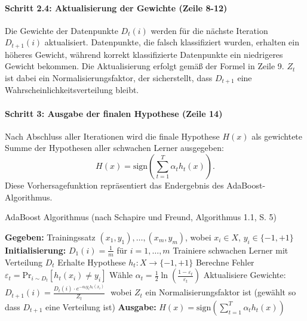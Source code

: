 \paragraph{Schritt 2.4: Aktualisierung der Gewichte (Zeile 8-12)}
Die Gewichte der Datenpunkte \( D_t(i) \) werden für die nächste Iteration \( D_{t+1}(i) \) aktualisiert. Datenpunkte, die falsch klassifiziert wurden, erhalten ein höheres Gewicht, während korrekt klassifizierte Datenpunkte ein niedrigeres Gewicht bekommen. Die Aktualisierung erfolgt gemäß der Formel in Zeile 9. \( Z_t \) ist dabei ein Normalisierungsfaktor, der sicherstellt, dass \( D_{t+1} \) eine Wahrscheinlichkeitsverteilung bleibt.

\paragraph{Schritt 3: Ausgabe der finalen Hypothese (Zeile 14)}
Nach Abschluss aller Iterationen wird die finale Hypothese \( H(x) \) als gewichtete Summe der Hypothesen aller schwachen Lerner ausgegeben:
\[
H(x) = \text{sign}\left(\sum_{t=1}^{T} \alpha_t h_t(x)\right).
\]
Diese Vorhersagefunktion repräsentiert das Endergebnis des AdaBoost-Algorithmus.

\begin{algorithm}[H]
    \caption{AdaBoost Algorithmus (nach Schapire und Freund, Algorithmus 1.1, S. 5)}\label{fig:adaboost}
    \begin{algorithmic}[1]
    \State \textbf{Gegeben:} Trainingssatz \( (x_1,y_1), \dots, (x_m,y_m) \), wobei \( x_i \in X \), \( y_i \in \{-1, +1\} \)
    \State \textbf{Initialisierung:} \( D_1(i) = \frac{1}{m} \) für \( i = 1, \dots, m \)
        \State Trainiere schwachen Lerner mit Verteilung \( D_t \)
        \State Erhalte Hypothese \( h_t : X \rightarrow \{-1, +1\} \)
        \State Berechne Fehler \( \varepsilon_t = \text{Pr}_{i \sim D_t} [h_t(x_i) \neq y_i] \)
        \State Wähle \( \alpha_t = \frac{1}{2} \ln\left(\frac{1 - \varepsilon_t}{\varepsilon_t}\right) \)
        \State Aktualisiere Gewichte: 
            \State \hfill \( D_{t+1}(i) = \frac{D_t(i) \cdot e^{-\alpha_t y_i h_t(x_i)}}{Z_t} \) \hfill\(\) %
        \EndFor
        \State wobei \( Z_t \) ein Normalisierungsfaktor ist (gewählt so dass \( D_{t+1} \) eine Verteilung ist)
    \EndFor
    \State \textbf{Ausgabe:} \( H(x) = \text{sign}\left(\sum_{t=1}^{T} \alpha_t h_t(x)\right) \)
    \end{algorithmic}
\end{algorithm}

